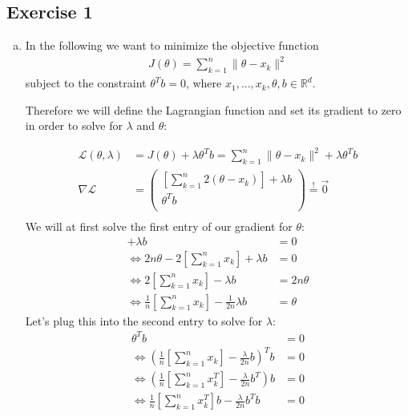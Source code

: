 \documentclass[10pt,a4paper]{article}
\begin{document}
\subsection*{Exercise 1}
\begin{enumerate}[(a)]
\item
In the following we want to minimize the objective function
\begin{align*}
    J(\theta) = \sum_{k = 1}^{n} \|\theta-x_k\|^2
\end{align*}
subject to the constraint $\theta^T b = 0$, where $x_1, ..., x_k, \theta, b \in \mathbb{R}^d$.

Therefore we will define the Lagrangian function and set its gradient to zero in order to solve for $\lambda$ and $\theta$:

\begin{align*}
    \mathcal{L}(\theta,\lambda) &= J(\theta) + \lambda\theta^T b = \sum_{k = 1}^{n} \|\theta-x_k\|^2 + \lambda\theta^T b \\
    \nabla\mathcal{L} &= \left(
        \begin{array}{c}
            [\sum_{k = 1}^{n} 2(\theta-x_k)] + \lambda b\\
            \theta^T b\\
        \end{array}
    \right) \overset{!}{=} \vec{0} \\
\end{align*}
We will at first solve the first entry of our gradient for $\theta$:
\begin{align*}
    [\sum_{k = 1}^{n} 2(\theta-x_k)] + \lambda b &= 0 \\
    \Leftrightarrow 2n\theta-2[\sum_{k = 1}^{n}x_k] + \lambda b &= 0\\
    \Leftrightarrow 2[\sum_{k = 1}^{n}x_k] - \lambda b &= 2n\theta\\
    \Leftrightarrow \frac{1}{n}[\sum_{k = 1}^{n}x_k] - \frac{1}{2n}\lambda b &= \theta
\end{align*}
Let's plug this into the second entry to solve for $\lambda$:
\begin{align*}
    \theta^T b &= 0 \\
    \Leftrightarrow (\frac{1}{n}[\sum_{k = 1}^{n}x_k] - \frac{\lambda}{2n}b)^T b &= 0\\
    \Leftrightarrow (\frac{1}{n}[\sum_{k = 1}^{n}x_k^T] - \frac{\lambda}{2n} b^T) b &= 0\\
    \Leftrightarrow \frac{1}{n}[\sum_{k = 1}^{n}x_k^T]b - \frac{\lambda}{2n} b^T b &= 0\\    

\end{align*}
\end{enumerate}
\end{document}
